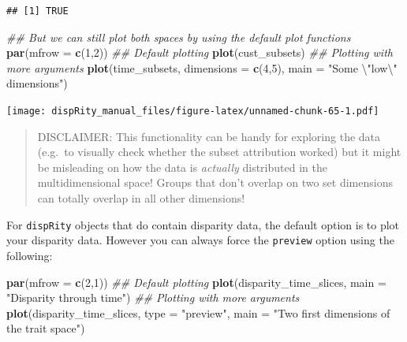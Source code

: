 \documentclass[]{book}
\newenvironment{Shaded}{\begin{snugshade}}{\end{snugshade}}
\newcommand{\CharTok}[1]{\textcolor[rgb]{0.31,0.60,0.02}{#1}}
\newcommand{\CommentTok}[1]{\textcolor[rgb]{0.56,0.35,0.01}{\textit{#1}}}
\newcommand{\DataTypeTok}[1]{\textcolor[rgb]{0.13,0.29,0.53}{#1}}
\newcommand{\DecValTok}[1]{\textcolor[rgb]{0.00,0.00,0.81}{#1}}
\newcommand{\KeywordTok}[1]{\textcolor[rgb]{0.13,0.29,0.53}{\textbf{#1}}}
\newcommand{\NormalTok}[1]{#1}
\newcommand{\StringTok}[1]{\textcolor[rgb]{0.31,0.60,0.02}{#1}}
\begin{document}
\begin{verbatim}
## [1] TRUE
\end{verbatim}

\begin{Shaded}
\begin{Highlighting}[]
\CommentTok{## But we can still plot both spaces by using the default plot functions}
\KeywordTok{par}\NormalTok{(}\DataTypeTok{mfrow =} \KeywordTok{c}\NormalTok{(}\DecValTok{1}\NormalTok{,}\DecValTok{2}\NormalTok{))}
\CommentTok{## Default plotting}
\KeywordTok{plot}\NormalTok{(cust_subsets)}
\CommentTok{## Plotting with more arguments}
\KeywordTok{plot}\NormalTok{(time_subsets, }\DataTypeTok{dimensions =} \KeywordTok{c}\NormalTok{(}\DecValTok{4}\NormalTok{,}\DecValTok{5}\NormalTok{),}
     \DataTypeTok{main =} \StringTok{"Some }\CharTok{\textbackslash{}"}\StringTok{low}\CharTok{\textbackslash{}"}\StringTok{ dimensions"}\NormalTok{)}
\end{Highlighting}
\end{Shaded}

\texttt{[image: dispRity\_manual\_files/figure-latex/unnamed-chunk-65-1.pdf]}

\begin{quote}
DISCLAIMER: This functionality can be handy for exploring the data (e.g.~to visually check whether the subset attribution worked) but it might be misleading on how the data is \emph{actually} distributed in the multidimensional space!
Groups that don't overlap on two set dimensions can totally overlap in all other dimensions!
\end{quote}

For \texttt{dispRity} objects that do contain disparity data, the default option is to plot your disparity data.
However you can always force the \texttt{preview} option using the following:

\begin{Shaded}
\begin{Highlighting}[]
\KeywordTok{par}\NormalTok{(}\DataTypeTok{mfrow =} \KeywordTok{c}\NormalTok{(}\DecValTok{2}\NormalTok{,}\DecValTok{1}\NormalTok{))}
\CommentTok{## Default plotting}
\KeywordTok{plot}\NormalTok{(disparity_time_slices, }\DataTypeTok{main =} \StringTok{"Disparity through time"}\NormalTok{)}
\CommentTok{## Plotting with more arguments}
\KeywordTok{plot}\NormalTok{(disparity_time_slices, }\DataTypeTok{type =} \StringTok{"preview"}\NormalTok{,}
     \DataTypeTok{main =} \StringTok{"Two first dimensions of the trait space"}\NormalTok{)}
\end{Highlighting}
\end{Shaded}
\end{document}
